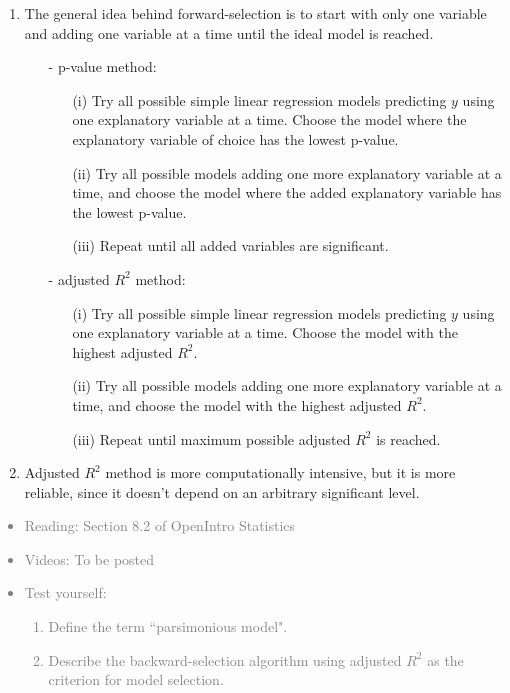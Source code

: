 \documentclass[11pt]{article}
\newcommand{\gray}[1]{\textcolor{gray}{#1}}
\begin{document}
\begin{enumerate}[resume]
\item The general idea behind forward-selection is to start with only one variable and adding one variable at a time until the ideal model is reached.
\begin{itemize}
\item[-] p-value method: 
\begin{enumerate}
\item[(i)] Try all possible simple linear regression models predicting $y$ using one explanatory variable at a time. Choose the model where the explanatory variable of choice has the lowest p-value.
\item[(ii)] Try all possible models adding one more explanatory variable at a time, and choose the model where the added explanatory variable has the lowest p-value.
\item[(iii)] Repeat until all added variables are significant.
\end{enumerate}
\item[-] adjusted $R^2$ method:
\begin{enumerate}
\item[(i)] Try all possible simple linear regression models predicting $y$ using one explanatory variable at a time. Choose the model with the highest adjusted $R^2$.
\item[(ii)] Try all possible models adding one more explanatory variable at a time, and choose the model with the highest adjusted $R^2$.
\item[(iii)] Repeat until maximum possible adjusted $R^2$ is reached.
\end{enumerate}
\end{itemize}

\item Adjusted $R^2$ method is more computationally intensive, but it is more reliable, since it doesn't depend on an arbitrary significant level.

\end{enumerate}

\gray{
{\it
\vspace{-0.55cm}
\begin{itemize}
\renewcommand{\labelitemi}{{\textcolor{dark}{$\ast$}}}
\item Reading: Section 8.2 of OpenIntro Statistics
\item Videos: To be posted
\item Test yourself:
\begin{enumerate}
\item Define the term ``parsimonious model".
\item Describe the backward-selection algorithm using adjusted $R^2$ as the criterion for model selection.
\end{enumerate}
\end{itemize}
}}
\end{document}
